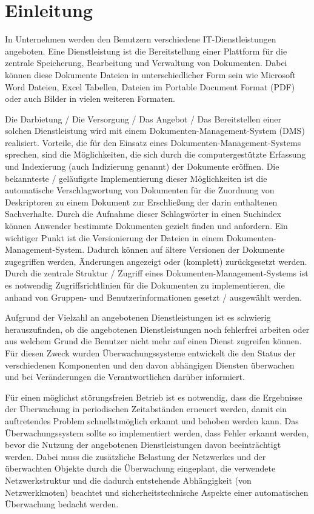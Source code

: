 \section{Einleitung}
In Unternehmen werden den Benutzern verschiedene IT-Dienstleistungen angeboten.
Eine Dienstleistung ist die Bereitstellung einer Plattform für die zentrale Speicherung, Bearbeitung und Verwaltung von Dokumenten.
Dabei können diese Dokumente Dateien in unterschiedlicher Form sein wie Microsoft Word Dateien, Excel Tabellen, Dateien im Portable Document Format (\gls{PDF}) oder auch Bilder in vielen weiteren Formaten.

Die Darbietung / Die Versorgung / Das Angebot / Das Bereitstellen einer solchen Dienstleistung wird mit einem Dokumenten-Management-System (\gls{DMS}) realisiert.
Vorteile, die für den Einsatz eines Dokumenten-Management-Systems sprechen, sind die Möglichkeiten, die sich durch die computergestützte Erfassung und Indexierung (auch Indizierung genannt) der Dokumente eröffnen.
Die bekannteste / geläufigste Implementierung dieser Möglichkeiten ist die automatische Verschlagwortung von Dokumenten für die Zuordnung von Deskriptoren zu einem Dokument zur Erschließung der darin enthaltenen Sachverhalte.
Durch die Aufnahme dieser Schlagwörter in einen Suchindex können Anwender bestimmte Dokumenten gezielt finden und anfordern.
Ein wichtiger Punkt ist die Versionierung der Dateien in einem Dokumenten-Management-System.
Dadurch können auf ältere Versionen der Dokumente zugegriffen werden, Änderungen angezeigt oder (komplett) zurückgesetzt werden.
Durch die zentrale Struktur / Zugriff eines Dokumenten-Management-Systems ist es notwendig Zugriffsrichtlinien für die Dokumenten zu implementieren, die anhand von Gruppen- und Benutzerinformationen gesetzt / ausgewählt werden.

Aufgrund der Vielzahl an angebotenen Dienstleistungen ist es schwierig herauszufinden, ob die angebotenen Dienstleistungen noch fehlerfrei arbeiten oder aus welchem Grund die Benutzer nicht mehr auf einen Dienst zugreifen können.
Für diesen Zweck wurden Überwachungssysteme entwickelt die den Status der verschiedenen Komponenten und den davon abhängigen Diensten überwachen und bei Veränderungen die Verantwortlichen darüber informiert.

Für einen möglichst störungsfreien Betrieb ist es notwendig, dass die Ergebnisse der Überwachung in periodischen Zeitabständen erneuert werden, damit ein auftretendes Problem schnellstmöglich erkannt und behoben werden kann.
Das Überwachungssystem sollte so implementiert werden, dass Fehler erkannt werden, bevor die Nutzung der angebotenen Dienstleistungen davon beeinträchtigt werden.
Dabei muss die zusätzliche Belastung der Netzwerkes und der überwachten Objekte durch die Überwachung eingeplant, die verwendete Netzwerkstruktur und die dadurch entstehende Abhängigkeit (von Netzwerkknoten) beachtet und sicherheitstechnische Aspekte einer automatischen Überwachung bedacht werden.\\


